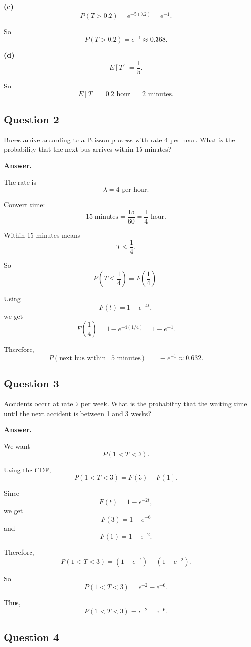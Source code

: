 \documentclass[12pt]{article}
\begin{document}
\textbf{(c)}
\[
P(T>0.2)=e^{-5(0.2)}=e^{-1}.
\]

So
\[
\boxed{P(T>0.2)=e^{-1}\approx 0.368.}
\]

\textbf{(d)}
\[
E[T]=\frac{1}{5}.
\]

So
\[
\boxed{E[T]=0.2\text{ hour}=12\text{ minutes}.}
\]

\subsection*{Question 2}

Buses arrive according to a Poisson process with rate \(4\) per hour. What is the probability that the next bus arrives within 15 minutes?

\textbf{Answer.}

The rate is
\[
\lambda=4 \text{ per hour}.
\]

Convert time:
\[
15\text{ minutes}=\frac{15}{60}=\frac{1}{4}\text{ hour}.
\]

Within 15 minutes means
\[
T\leq \frac{1}{4}.
\]

So
\[
P\left(T\leq \frac{1}{4}\right)=F\left(\frac{1}{4}\right).
\]

Using
\[
F(t)=1-e^{-4t},
\]
we get
\[
F\left(\frac{1}{4}\right)=1-e^{-4(1/4)}=1-e^{-1}.
\]

Therefore,
\[
\boxed{P(\text{next bus within 15 minutes})=1-e^{-1}\approx 0.632.}
\]

\subsection*{Question 3}

Accidents occur at rate \(2\) per week. What is the probability that the waiting time until the next accident is between 1 and 3 weeks?

\textbf{Answer.}

We want
\[
P(1<T<3).
\]

Using the CDF,
\[
P(1<T<3)=F(3)-F(1).
\]

Since
\[
F(t)=1-e^{-2t},
\]
we get
\[
F(3)=1-e^{-6}
\]
and
\[
F(1)=1-e^{-2}.
\]

Therefore,
\[
P(1<T<3)=(1-e^{-6})-(1-e^{-2}).
\]

So
\[
P(1<T<3)=e^{-2}-e^{-6}.
\]

Thus,
\[
\boxed{P(1<T<3)=e^{-2}-e^{-6}.}
\]

\subsection*{Question 4}
\end{document}
